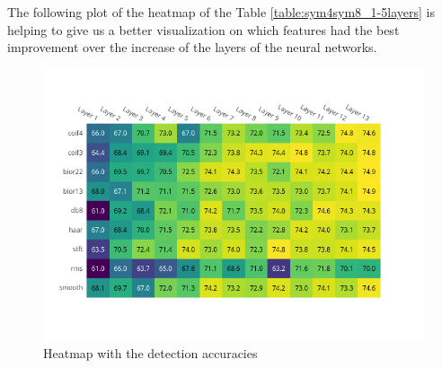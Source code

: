 The following plot of the heatmap of the Table \ref{table:sym4sym8_1-5layers} is helping to give us a better visualization on which features had the best improvement over the increase of the layers of the neural networks.
\begin{figure}[h!]
\includegraphics[width=17cm,center,keepaspectratio]{figures/accuracy_heatmap}
   \caption{Heatmap with the detection accuracies}
   \label{fig:accuracy_heatmap} 
\end{figure}
